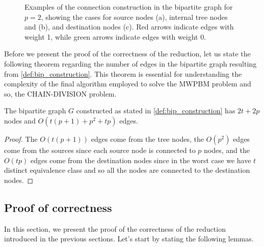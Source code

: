 \begin{figure}[H]
\begin{subfigure}[b]{0.3\textwidth}
        \caption{}
        \label{fig:sub3}
    \end{subfigure}

    \caption[Examples of reduction to a bipartite graph]{Examples of the connection construction in the bipartite graph for $p=2$, showing the cases for source nodes \sourceset (a), internal tree nodes  and  (b), and destination nodes \destset (c). Red arrows indicate edges with weight 1, while green arrows indicate edges with weight 0.}
    \label{fig:reduction_small_examples}
\end{figure}

Before we present the proof of the correctness of the reduction, let us state the following theorem regarding the number of edges in the bipartite graph resulting from \cref{def:bip_construction}. This theorem is essential for understanding the complexity of the final algorithm employed to solve the \textsc{MWPBM} problem and so, the \textsc{CHAIN-DIVISION} problem.

\begin{theorem}
    The bipartite graph $G$ constructed as stated in \cref{def:bip_construction} has $2t + 2p$ nodes and $O(t (p + 1) + p^2 + tp)$ edges.
\end{theorem}

\begin{proof}
    The $O(t (p + 1))$ edges come from the tree nodes, the $O(p^2)$ edges come from the sources since each source node is connected to $p$ nodes, and the $O(tp)$ edges come from the destination nodes since in the worst case we have $t$ distinct equivalence class and so all the nodes are connected to the destination nodes. 
\end{proof}

\subsection{Proof of correctness}
In this section, we present the proof of the correctness of the reduction introduced in the previous sections. Let's start by stating the following lemmas.

